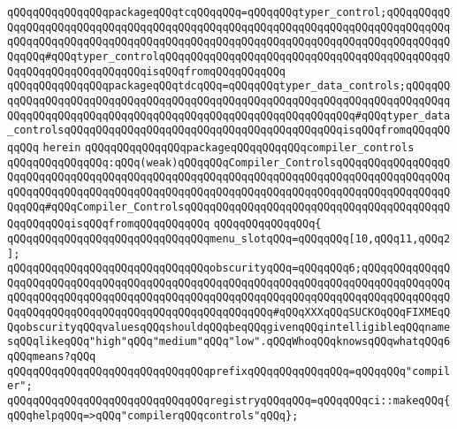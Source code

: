\verb|qQQqqQQqqQQqqQQqpackageqQQqtcqQQqqQQq=qQQqqQQqtyper_control;qQQqqQQqqQQqqQQqqQQqqQQqqQQqqQQqqQQqqQQqqQQqqQQqqQQqqQQqqQQqqQQqqQQqqQQqqQQqqQQqqQQqqQQqqQQqqQQqqQQqqQQqqQQqqQQqqQQqqQQqqQQqqQQqqQQqqQQqqQQqqQQqqQQqqQQqqQQq#qQQqtyper_controlqQQqqQQqqQQqqQQqqQQqqQQqqQQqqQQqqQQqqQQqqQQqqQQqqQQqqQQqqQQqqQQqqQQqisqQQqfromqQQqqQQqqQQq|\newline
\verb|qQQqqQQqqQQqqQQqpackageqQQqtdcqQQq=qQQqqQQqtyper_data_controls;qQQqqQQqqQQqqQQqqQQqqQQqqQQqqQQqqQQqqQQqqQQqqQQqqQQqqQQqqQQqqQQqqQQqqQQqqQQqqQQqqQQqqQQqqQQqqQQqqQQqqQQqqQQqqQQqqQQqqQQqqQQqqQQqqQQq#qQQqtyper_data_controlsqQQqqQQqqQQqqQQqqQQqqQQqqQQqqQQqqQQqqQQqqQQqisqQQqfromqQQqqQQqqQQq|\newline
\verb|herein|\newline
\newline
\verb|qQQqqQQqqQQqqQQqpackageqQQqqQQqqQQqcompiler_controls|\newline
\verb|qQQqqQQqqQQqqQQq:qQQq(weak)qQQqqQQqCompiler_ControlsqQQqqQQqqQQqqQQqqQQqqQQqqQQqqQQqqQQqqQQqqQQqqQQqqQQqqQQqqQQqqQQqqQQqqQQqqQQqqQQqqQQqqQQqqQQqqQQqqQQqqQQqqQQqqQQqqQQqqQQqqQQqqQQqqQQqqQQqqQQqqQQqqQQqqQQqqQQqqQQqqQQq#qQQqCompiler_ControlsqQQqqQQqqQQqqQQqqQQqqQQqqQQqqQQqqQQqqQQqqQQqqQQqqQQqisqQQqfromqQQqqQQqqQQq|\newline
\verb|qQQqqQQqqQQqqQQq{|\newline
\verb|qQQqqQQqqQQqqQQqqQQqqQQqqQQqqQQqmenu_slotqQQq=qQQqqQQq[10,qQQq11,qQQq2];|\newline
\verb|qQQqqQQqqQQqqQQqqQQqqQQqqQQqqQQqobscurityqQQq=qQQqqQQq6;qQQqqQQqqQQqqQQqqQQqqQQqqQQqqQQqqQQqqQQqqQQqqQQqqQQqqQQqqQQqqQQqqQQqqQQqqQQqqQQqqQQqqQQqqQQqqQQqqQQqqQQqqQQqqQQqqQQqqQQqqQQqqQQqqQQqqQQqqQQqqQQqqQQqqQQqqQQqqQQqqQQqqQQqqQQqqQQqqQQqqQQqqQQqqQQqqQQq#qQQqXXXqQQqSUCKOqQQqFIXMEqQQqobscurityqQQqvaluesqQQqshouldqQQqbeqQQqgivenqQQqintelligibleqQQqnamesqQQqlikeqQQq"high"qQQq"medium"qQQq"low".qQQqWhoqQQqknowsqQQqwhatqQQq6qQQqmeans?qQQq|\newline
\verb|qQQqqQQqqQQqqQQqqQQqqQQqqQQqqQQqprefixqQQqqQQqqQQqqQQq=qQQqqQQq"compiler";|\newline
\newline
\verb|qQQqqQQqqQQqqQQqqQQqqQQqqQQqqQQqregistryqQQqqQQq=qQQqqQQqci::makeqQQq{qQQqhelpqQQq=>qQQq"compilerqQQqcontrols"qQQq};|\newline
